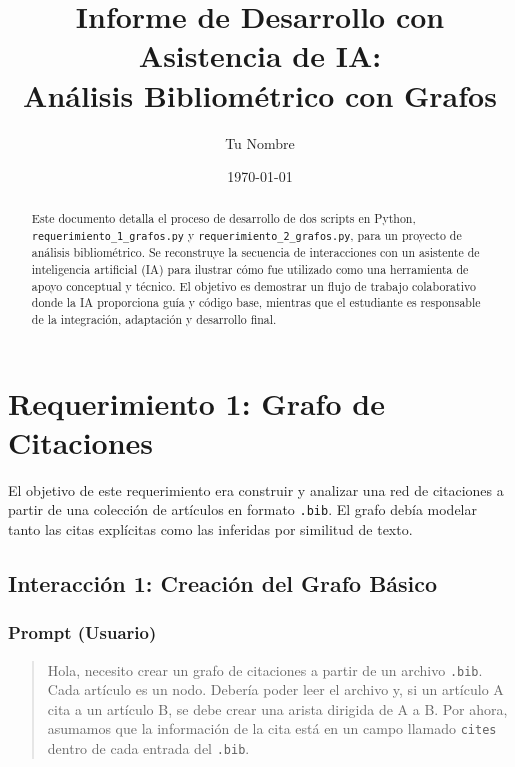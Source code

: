 \documentclass[12pt]{article}
\title{Informe de Desarrollo con Asistencia de IA: \\ Análisis Bibliométrico con Grafos}
\author{Tu Nombre}
\date{\today}
\begin{document}
\maketitle

\begin{abstract}
Este documento detalla el proceso de desarrollo de dos scripts en Python, \texttt{requerimiento\_1\_grafos.py} y \texttt{requerimiento\_2\_grafos.py}, para un proyecto de análisis bibliométrico. Se reconstruye la secuencia de interacciones con un asistente de inteligencia artificial (IA) para ilustrar cómo fue utilizado como una herramienta de apoyo conceptual y técnico. El objetivo es demostrar un flujo de trabajo colaborativo donde la IA proporciona guía y código base, mientras que el estudiante es responsable de la integración, adaptación y desarrollo final.
\end{abstract}

\tableofcontents
\newpage

\section{Requerimiento 1: Grafo de Citaciones}
\label{sec:req1}

El objetivo de este requerimiento era construir y analizar una red de citaciones a partir de una colección de artículos en formato \texttt{.bib}. El grafo debía modelar tanto las citas explícitas como las inferidas por similitud de texto.

\subsection{Interacción 1: Creación del Grafo Básico}

\subsubsection*{Prompt (Usuario)}
\begin{quote}
Hola, necesito crear un grafo de citaciones a partir de un archivo \texttt{.bib}. Cada artículo es un nodo. Debería poder leer el archivo y, si un artículo A cita a un artículo B, se debe crear una arista dirigida de A a B. Por ahora, asumamos que la información de la cita está en un campo llamado \texttt{cites} dentro de cada entrada del \texttt{.bib}.
\end{quote}
\end{document}
